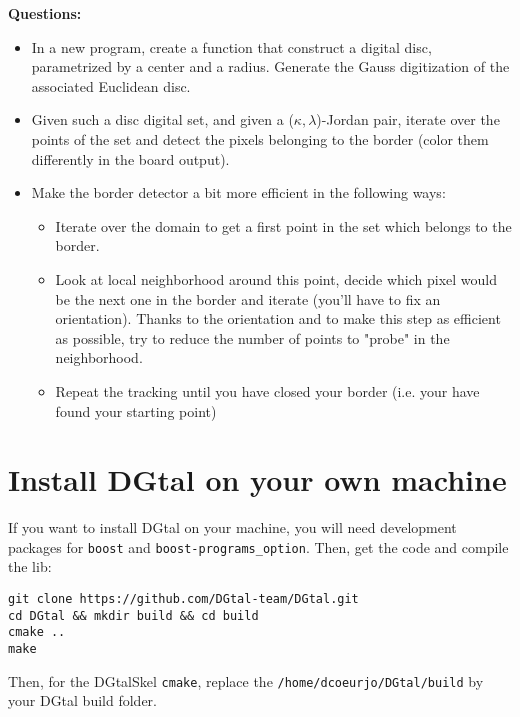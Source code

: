 \documentclass[a4paper, 11pt]{article}
\begin{document}
\noindent \textbf{Questions:}
\begin{itemize}
	\item In a new program, create a function that construct a digital disc, parametrized by a center and a radius. Generate the Gauss digitization of the associated Euclidean disc.

	\item Given such a disc digital set, and given a ($\kappa,\lambda$)-Jordan pair, iterate over the points of the set and detect the pixels belonging to the border (color them differently in the board output).

	\item Make the border detector a bit more efficient in the following ways:
	\begin{itemize}
		\item Iterate over the domain to get a first point in the set which belongs to the border.
		\item Look at local neighborhood around this point, decide which pixel would be the next one in the border and iterate (you'll have to fix an orientation). Thanks to the orientation and to make this step as efficient as possible, try to reduce the number of points to "probe" in the neighborhood.
		\item Repeat the tracking until you have closed your border (i.e. your have found your starting point)
	\end{itemize}
\end{itemize}


\appendix
\section*{Install DGtal on your own machine}

\par If you want to install DGtal on your machine, you will need development  packages for \texttt{boost} and \texttt{boost-programs\_option}. Then, get the code and compile the lib:
\begin{verbatim}
git clone https://github.com/DGtal-team/DGtal.git
cd DGtal && mkdir build && cd build
cmake .. 
make
\end{verbatim}
\par Then, for the DGtalSkel \texttt{cmake}, replace the \texttt{/home/dcoeurjo/DGtal/build} by your DGtal build folder.
\end{document}
